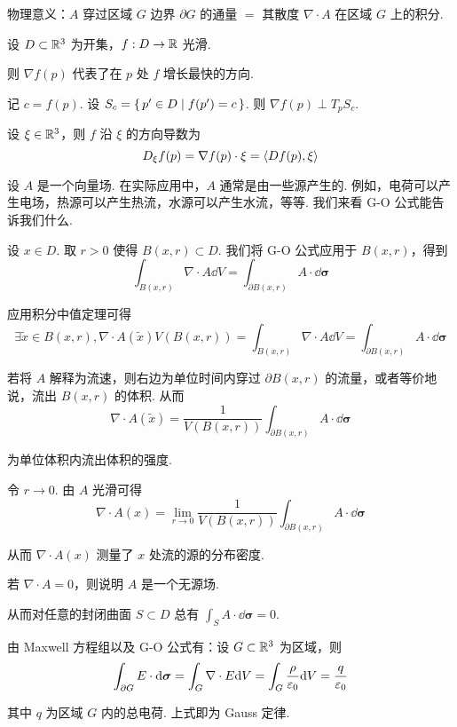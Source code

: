 \textcolor{mydarkblue}{物理意义：}$A$ 穿过区域 $G$ 边界 $\partial G$ 的通量 $=$ 其散度 $\nabla\cdot A$ 在区域 $G$ 上的积分.



设 $D\subset\mathbb{R}^3$ 为开集，$f:D\to\mathbb{R}$ 光滑.

则 $\nabla f(p)$ 代表了在 $p$ 处 $f$ 增长最快的方向.

记 $c=f(p)$. 设 $S_c=\set{p'\in D|f(p')=c}$. 则 $\nabla f(p)\perp T_pS_c$.


设 $\xi\in\mathbb{R}^3$，则 $f$ 沿 $\xi$ 的方向导数为
$$
D_\xi f(p)=\nabla f(p)\cdot\xi=\left\langle{D f(p),\xi}\right\rangle
$$


设 $A$ 是一个向量场. 在实际应用中，$A$ 通常是由一些源产生的. 例如，电荷可以产生电场，热源可以产生热流，水源可以产生水流，等等. 我们来看 G-O 公式能告诉我们什么.

设 $x\in D$. 取 $r>0$ 使得 $B(x,r)\subset D$. 我们将 G-O 公式应用于 $B(x,r)$，得到
$$
\int_{B(x,r)}\nabla\cdot A\dd V=\int_{\partial B(x,r)}A\cdot\dd\bm{\sigma}
$$

应用积分中值定理可得
$$
\exists \widetilde{x}\in B(x,r),\nabla\cdot A(\widetilde{x})V(B(x,r))=\int_{B(x,r)}\nabla\cdot A\dd V=\int_{\partial B(x,r)}A\cdot\dd\bm{\sigma}
$$

若将 $A$ 解释为流速，则右边为单位时间内穿过 $\partial B(x,r)$ 的流量，或者等价地说，流出 $B(x,r)$ 的体积. 从而
$$
\nabla\cdot A(\widetilde{x})=\frac{1}{V(B(x,r))}\int_{\partial B(x,r)}A\cdot\dd\bm{\sigma}
$$

为单位体积内流出体积的强度.

令 $r\to 0$. 由 $A$ 光滑可得
$$
\nabla\cdot A(x)=\lim_{r\to 0}\frac{1}{V(B(x,r))}\int_{\partial B(x,r)}A\cdot\dd\bm{\sigma}
$$

从而 $\nabla\cdot A(x)$ 测量了 $x$ 处流的源的分布密度.

\begin{example}
    若 $\nabla\cdot A=0$，则说明 $A$ 是一个无源场.

    从而对任意的封闭曲面 $S\subset D$ 总有 $\displaystyle\int_SA\cdot\dd\bm{\sigma}=0$.
\end{example}

\begin{example}[ Gauss 定律]
    由 Maxwell 方程组以及 G-O 公式有：设 $G\subset\mathbb{R}^3$ 为区域，则
$$
\int_{\partial G}E\cdot\mathrm{d}\bm{\sigma}=\int_G\nabla\cdot E\mathrm{d} V=\int_G\frac{\rho}{\varepsilon_0}\mathrm{d} V=\frac{q}{\varepsilon_0}
$$

    其中 $q$ 为区域 $G$ 内的总电荷. 上式即为 Gauss 定律.
\end{example}

